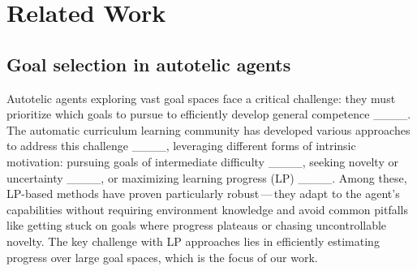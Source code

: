 \section{Related Work}
\label{sec:related_work}

\subsection{Goal selection in autotelic agents}
Autotelic agents exploring vast goal spaces face a critical challenge: they must prioritize which goals to pursue to efficiently develop general competence ____. The automatic curriculum learning community has developed various approaches to address this challenge ____, leveraging different forms of intrinsic motivation: pursuing goals of intermediate difficulty ____, seeking novelty or uncertainty ____, or maximizing learning progress (LP) ____. Among these, LP-based methods have proven particularly robust\,---\,they adapt to the agent's capabilities without requiring environment knowledge and avoid common pitfalls like getting stuck on goals where progress plateaus or chasing uncontrollable novelty. The key challenge with LP approaches lies in efficiently estimating progress over large goal spaces, which is the focus of our work.



